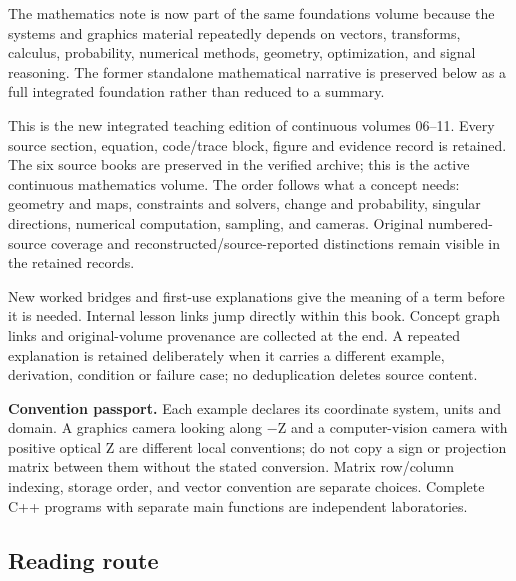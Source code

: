 The mathematics note is now part of the same foundations volume because the systems and graphics material repeatedly depends on vectors, transforms, calculus, probability, numerical methods, geometry, optimization, and signal reasoning. The former standalone mathematical narrative is preserved below as a full integrated foundation rather than reduced to a summary.

This is the new integrated teaching edition of continuous volumes 06--11. Every source section, equation, code/trace block, figure and evidence record is retained. The six source books are preserved in the verified archive; this is the active continuous mathematics volume. The order follows what a concept needs: geometry and maps, constraints and solvers, change and probability, singular directions, numerical computation, sampling, and cameras. Original numbered-source coverage and reconstructed/source-reported distinctions remain visible in the retained records.

New worked bridges and first-use explanations give the meaning of a term before it is needed. Internal lesson links jump directly within this book. Concept graph links and original-volume provenance are collected at the end. A repeated explanation is retained deliberately when it carries a different example, derivation, condition or failure case; no deduplication deletes source content.

\textbf{Convention passport.} Each example declares its coordinate system, units and domain. A graphics camera looking along −Z and a computer-vision camera with positive optical Z are different local conventions; do not copy a sign or projection matrix between them without the stated conversion. Matrix row/column indexing, storage order, and vector convention are separate choices. Complete C++ programs with separate main functions are independent laboratories.

\subsection{Reading route}\label{01-foundations-i-ch017-reading-route}

